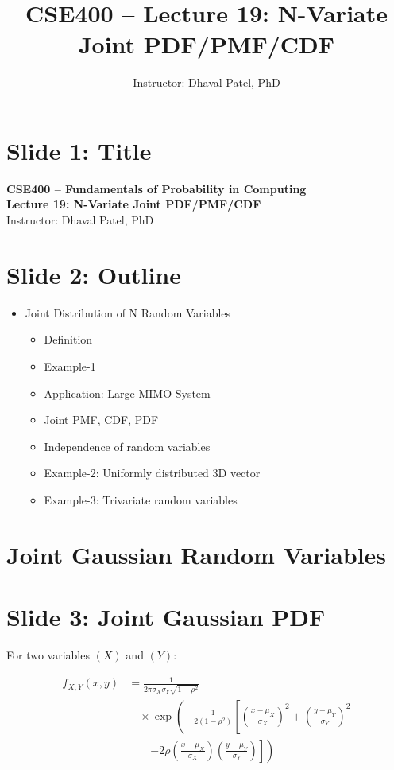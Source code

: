 \documentclass[12pt]{article}
\begin{document}
\title{CSE400 – Lecture 19: N-Variate Joint PDF/PMF/CDF}
\author{Instructor: Dhaval Patel, PhD}
\date{}
\maketitle

\section*{Slide 1: Title}

\textbf{CSE400 – Fundamentals of Probability in Computing} \\
\textbf{Lecture 19: N-Variate Joint PDF/PMF/CDF} \\
Instructor: Dhaval Patel, PhD

\section*{Slide 2: Outline}

\begin{itemize}
\item Joint Distribution of N Random Variables
\begin{itemize}
\item Definition
\item Example-1
\item Application: Large MIMO System
\item Joint PMF, CDF, PDF
\item Independence of random variables
\item Example-2: Uniformly distributed 3D vector
\item Example-3: Trivariate random variables
\end{itemize}
\end{itemize}

\section*{Joint Gaussian Random Variables}

\section*{Slide 3: Joint Gaussian PDF}

For two variables $(X)$ and $(Y)$:

\[
\begin{aligned}
f_{X,Y}(x,y) &=
\frac{1}{2\pi \sigma_X \sigma_Y \sqrt{1-\rho^2}} \\
&\quad \times \exp \left(
-\frac{1}{2(1-\rho^2)}
\left[
\left(\frac{x-\mu_X}{\sigma_X}\right)^2
+
\left(\frac{y-\mu_Y}{\sigma_Y}\right)^2
\right.\right. \\
&\qquad \left.\left.
-2\rho
\left(\frac{x-\mu_X}{\sigma_X}\right)
\left(\frac{y-\mu_Y}{\sigma_Y}\right)
\right]
\right)
\end{aligned}
\]
\end{document}
